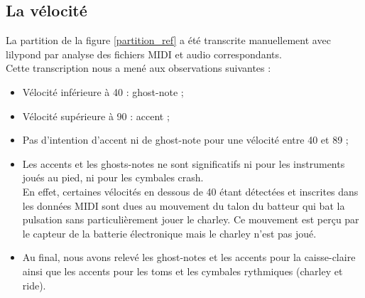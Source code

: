 \subsection*{La vélocité}
\label{velocite}
La partition de la figure \ref{partition_ref} a été transcrite manuellement avec lilypond par analyse des fichiers MIDI et audio correspondants.\\
Cette transcription nous a mené aux observations suivantes :
\begin{itemize}
	\item Vélocité inférieure à 40 : ghost-note ;
	\item Vélocité supérieure à 90 : accent ;
	\item Pas d’intention d’accent ni de ghost-note pour une vélocité entre 40 et 89 ;
	\item Les accents et les ghosts-notes ne sont significatifs ni pour les instruments joués au pied, ni pour les cymbales crash.\\
	En effet, certaines vélocités en dessous de 40 étant détectées et inscrites dans les données MIDI sont dues au mouvement du talon du batteur qui bat la pulsation sans particulièrement jouer le charley. Ce mouvement est perçu par le capteur de la batterie électronique mais le charley n’est pas joué.
	\item Au final, nous avons relevé les ghost-notes et les accents pour la caisse-claire ainsi que les accents pour les toms et les cymbales rythmiques (charley et ride).
\end{itemize}
